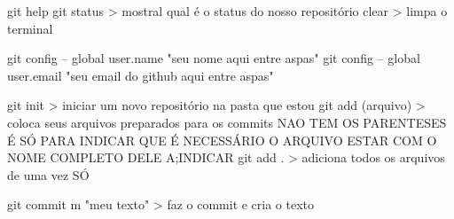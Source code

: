 
git help
git status > mostral qual é o status do nosso repositório
clear > limpa o terminal

git config -- global user.name "seu nome aqui entre aspas"
git config -- global user.email "seu email do github aqui entre aspas"

git init > iniciar um novo repositório na pasta que estou
git add (arquivo) > coloca seus arquivos preparados para os commits NAO TEM OS PARENTESES É SÓ PARA INDICAR QUE É NECESSÁRIO O ARQUIVO ESTAR COM O NOME COMPLETO DELE A;INDICAR
git add . > adiciona todos os arquivos de uma vez SÓ

git commit m "meu texto" > faz o commit e cria  o texto